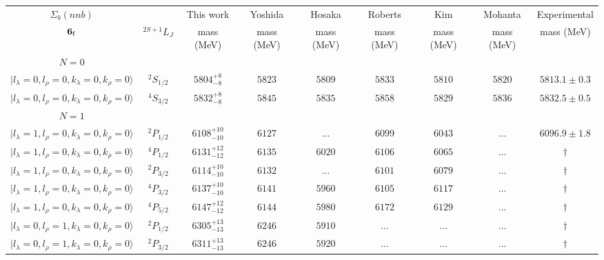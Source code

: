 \begin{tabular}{c c| c c c c c c c}\hline \hline
$\Sigma_{b}(nnb)$&                  & This work   &   Yoshida     &  Hosaka      &  Roberts    & Kim        & Mohanta    & Experimental  \\ 
${\bf {6}}_{\rm f}$  & $^{2S+1}L_{J}$ & mass (MeV)  &   mass (MeV)  &  mass (MeV)  &  mass (MeV) & mass (MeV) & mass (MeV) &      mass (MeV) \\ \hline
\hline
 $N=0$  &  &  &  &  &  \\ 
$\vert l_{\lambda}\!\!=\!0, l_{\rho}\!\!=\!0, k_{\lambda}\!\!=\!0, k_{\rho}\!\!=\!0 \rangle$ & $^{2}S_{1/2}$ & $5804^{+8}_{-8}$ & $5823$ & $5809$ & $5833$ & $5810$ & $5820$ & $5813.1\pm 0.3$ \\ 
$\vert l_{\lambda}\!\!=\!0, l_{\rho}\!\!=\!0, k_{\lambda}\!\!=\!0, k_{\rho}\!\!=\!0 \rangle$ & $^{4}S_{3/2}$ & $5832^{+8}_{-8}$ & $5845$ & $5835$ & $5858$ & $5829$ & $5836$ & $5832.5\pm 0.5$ \\ 
\hline
 $N=1$  &  &  &  &  &  \\ 
$\vert l_{\lambda}\!\!=\!1, l_{\rho}\!\!=\!0, k_{\lambda}\!\!=\!0, k_{\rho}\!\!=\!0 \rangle$ & $^{2}P_{1/2}$ & $6108^{+10}_{-10}$ & $6127$ & ... & $6099$ & $6043$ & ... & $6096.9\pm 1.8$ \\ 
$\vert l_{\lambda}\!\!=\!1, l_{\rho}\!\!=\!0, k_{\lambda}\!\!=\!0, k_{\rho}\!\!=\!0 \rangle$ & $^{4}P_{1/2}$ & $6131^{+12}_{-12}$ & $6135$ & $6020$ & $6106$ & $6065$ & ... & $\dagger$ \\ 
$\vert l_{\lambda}\!\!=\!1, l_{\rho}\!\!=\!0, k_{\lambda}\!\!=\!0, k_{\rho}\!\!=\!0 \rangle$ & $^{2}P_{3/2}$ & $6114^{+10}_{-10}$ & $6132$ & ... & $6101$ & $6079$ & ... & $\dagger$ \\ 
$\vert l_{\lambda}\!\!=\!1, l_{\rho}\!\!=\!0, k_{\lambda}\!\!=\!0, k_{\rho}\!\!=\!0 \rangle$ & $^{4}P_{3/2}$ & $6137^{+10}_{-10}$ & $6141$ & $5960$ & $6105$ & $6117$ & ... & $\dagger$ \\ 
$\vert l_{\lambda}\!\!=\!1, l_{\rho}\!\!=\!0, k_{\lambda}\!\!=\!0, k_{\rho}\!\!=\!0 \rangle$ & $^{4}P_{5/2}$ & $6147^{+12}_{-12}$ & $6144$ & $5980$ & $6172$ & $6129$ & ... & $\dagger$ \\ 
$\vert l_{\lambda}\!\!=\!0, l_{\rho}\!\!=\!1, k_{\lambda}\!\!=\!0, k_{\rho}\!\!=\!0 \rangle$ & $^{2}P_{1/2}$ & $6305^{+13}_{-13}$ & $6246$ & $5910$ & ... & ... & ... & $\dagger$ \\ 
$\vert l_{\lambda}\!\!=\!0, l_{\rho}\!\!=\!1, k_{\lambda}\!\!=\!0, k_{\rho}\!\!=\!0 \rangle$ & $^{2}P_{3/2}$ & $6311^{+13}_{-13}$ & $6246$ & $5920$ & ... & ... & ... & $\dagger$ \\ 

\end{tabular}
